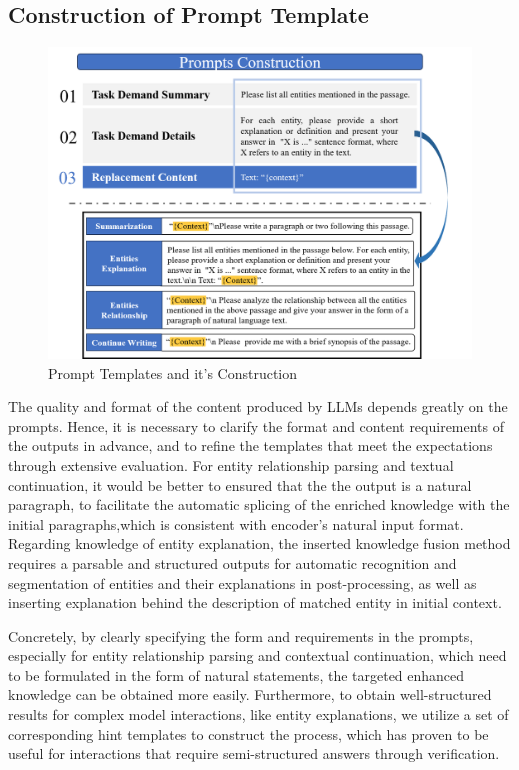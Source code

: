 \subsection{Construction of Prompt Template}
\label{sec:prompt_construction}
\begin{figure}[h]
	\centering
	\includegraphics[width=14.5cm]{Prompts_construction.png}
	\caption{Prompt Templates and it's Construction}
	\label{fig:prompt_template}
\end{figure}   

The quality and format of the content produced by LLMs depends greatly on the prompts. Hence, it is necessary to clarify the format and content requirements of the outputs in advance, and to refine the templates that meet the expectations through extensive evaluation.
For entity relationship parsing and textual continuation, it would be better to ensured that the the output is a natural paragraph, to facilitate the automatic splicing of the enriched knowledge with the initial paragraphs,which is consistent with encoder's natural input format.
Regarding knowledge of entity explanation, the inserted knowledge fusion method requires a parsable and structured outputs for automatic recognition and segmentation of entities and their explanations in post-processing, as well as inserting explanation behind the description of matched entity in initial context.

Concretely, by clearly specifying the form and requirements in the prompts, especially for entity relationship parsing and contextual continuation, which need to be formulated in the form of natural statements, the targeted enhanced knowledge can be obtained more easily.
Furthermore, to obtain well-structured results for complex model interactions, like entity explanations, we utilize a set of corresponding hint templates to construct the process, which has proven to be useful for interactions that require semi-structured answers through verification. 


